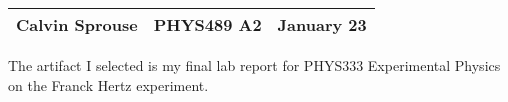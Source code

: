 \documentclass[a4paper, 12pt]{config/homework}
\begin{document}
\noindent
\begin{tabularx}{\textwidth}{>{\centering\arraybackslash}X>{\centering\arraybackslash}X>{\centering\arraybackslash}X}
Calvin Sprouse & PHYS489 A2 & 2024 January 23\\
\midrule
\end{tabularx}



The artifact I selected is my final lab report for PHYS333 Experimental Physics on the Franck Hertz experiment.


\end{document}
